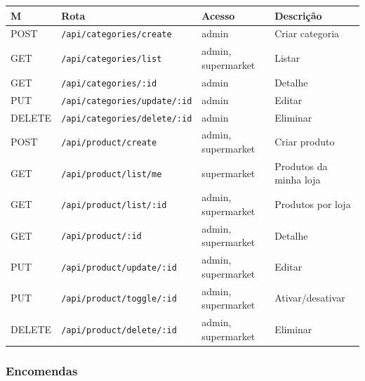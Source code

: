 \documentclass[12pt,a4paper]{article}
\begin{document}
\begin{center}
\begin{tabular}{llll}
\toprule
\textbf{M} & \textbf{Rota} & \textbf{Acesso} & \textbf{Descrição} \\
\midrule
POST   & \texttt{/api/categories/create}       & admin & Criar categoria \\
GET    & \texttt{/api/categories/list}         & admin, supermarket & Listar \\
GET    & \texttt{/api/categories/:id}          & admin & Detalhe \\
PUT    & \texttt{/api/categories/update/:id}   & admin & Editar \\
DELETE & \texttt{/api/categories/delete/:id}   & admin & Eliminar \\
\midrule
POST   & \texttt{/api/product/create}          & admin, supermarket & Criar produto \\
GET    & \texttt{/api/product/list/me}         & supermarket & Produtos da minha loja \\
GET    & \texttt{/api/product/list/:id}        & admin, supermarket & Produtos por loja \\
GET    & \texttt{/api/product/:id}             & admin, supermarket & Detalhe \\
PUT    & \texttt{/api/product/update/:id}      & admin, supermarket & Editar \\
PUT    & \texttt{/api/product/toggle/:id}      & admin, supermarket & Ativar/desativar \\
DELETE & \texttt{/api/product/delete/:id}      & admin, supermarket & Eliminar \\
\bottomrule
\end{tabular}
\end{center}

\subsubsection{Encomendas}
\end{document}
